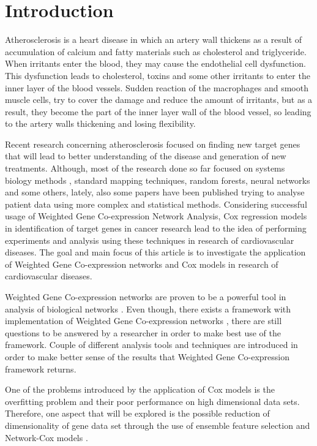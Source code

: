 \documentclass{ba-kecs}
\numberwithin{figure}{section}
\numberwithin{equation}{section}
\begin{document}
\section{Introduction}
Atherosclerosis is a heart disease in which an artery wall thickens as a result of accumulation of calcium and fatty materials such as cholesterol and triglyceride. When irritants enter the blood, they may cause the endothelial cell dysfunction. This dysfunction leads to cholesterol, toxins and some other irritants to enter the inner layer of the blood vessels. Sudden reaction of the macrophages and smooth muscle cells, try to cover the damage and reduce the amount of irritants, but as a result, they become the part of the inner layer wall of the blood vessel, so leading to the artery walls thickening and losing flexibility.

Recent research concerning atherosclerosis focused on finding new target genes that will lead to better understanding of the disease and generation of new treatments. Although, most of the research done so far focused on systems biology methods \cite{systems}, standard mapping techniques, random forests, neural networks and some others, lately, also some papers have been published trying to analyse patient data using more complex and statistical methods. Considering successful usage of Weighted Gene Co-expression Network Analysis, Cox regression models in identification of target genes in cancer research\cite{wgcna2,cox2,netcox} lead to the idea of performing experiments and analysis using these techniques in research of cardiovascular diseases. The goal and main focus of this article is to investigate the application of Weighted Gene Co-expression networks and Cox models in research of cardiovascular diseases.

Weighted Gene Co-expression networks are proven to be a powerful tool in analysis of biological networks \cite{wgcna2}. Even though, there exists a framework with implementation of Weighted Gene Co-expression networks \cite{wgcna3}, there are still questions to be answered by a researcher in order to make best use of the framework. Couple of different analysis tools and techniques are introduced in order to make better sense of the results that Weighted Gene Co-expression framework returns.

One of the problems introduced by the application of Cox models is the overfitting problem and their poor performance on high dimensional data sets. Therefore, one aspect that will be explored is the possible reduction of dimensionality of gene data set through the use of ensemble feature selection and Network-Cox models \cite{bootstrap,netcox}.
\end{document}
